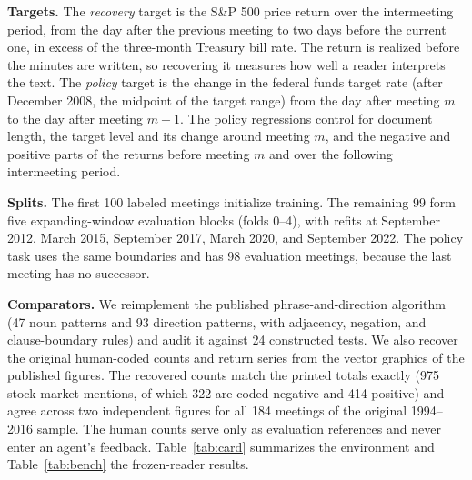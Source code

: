 \documentclass[sigconf]{acmart}
\begin{document}
\textbf{Targets.} The \emph{recovery} target is the S\&P 500 price return over the intermeeting period, from the day after the previous meeting to two days before the current one, in excess of the three-month Treasury bill rate. The return is realized before the minutes are written, so recovering it measures how well a reader interprets the text. The \emph{policy} target is the change in the federal funds target rate (after December 2008, the midpoint of the target range) from the day after meeting $m$ to the day after meeting $m+1$. The policy regressions control for document length, the target level and its change around meeting $m$, and the negative and positive parts of the returns before meeting $m$ and over the following intermeeting period.

\textbf{Splits.} The first 100 labeled meetings initialize training. The remaining 99 form five expanding-window evaluation blocks (folds 0--4), with refits at September 2012, March 2015, September 2017, March 2020, and September 2022. The policy task uses the same boundaries and has 98 evaluation meetings, because the last meeting has no successor.

\textbf{Comparators.} We reimplement the published phrase-and-direction algorithm (47 noun patterns and 93 direction patterns, with adjacency, negation, and clause-boundary rules) and audit it against 24 constructed tests. We also recover the original human-coded counts and return series from the vector graphics of the published figures. The recovered counts match the printed totals exactly (975 stock-market mentions, of which 322 are coded negative and 414 positive) and agree across two independent figures for all 184 meetings of the original 1994--2016 sample. The human counts serve only as evaluation references and never enter an agent's feedback. Table~\ref{tab:card} summarizes the environment and Table~\ref{tab:bench} the frozen-reader results.
\end{document}
